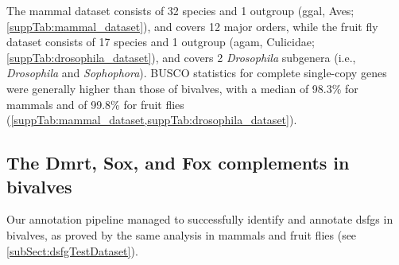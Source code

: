 The mammal dataset consists of 32 species and 1 outgroup (\gls{ggal}, Aves; \cref{suppTab:mammal_dataset}), and covers 12 major orders, while the fruit fly dataset consists of 17 species and 1 outgroup (\gls{agam}, Culicidae; \cref{suppTab:drosophila_dataset}), and covers 2 \textit{Drosophila} subgenera (i.e., \textit{Drosophila} and \textit{Sophophora}). BUSCO statistics for complete single-copy genes were generally higher than those of bivalves, with a median of 98.3\% for mammals and of 99.8\% for fruit flies (\cref{suppTab:mammal_dataset,suppTab:drosophila_dataset}).

\subsection{The Dmrt, Sox, and Fox complements in bivalves}
Our annotation pipeline managed to successfully identify and annotate \glspl{dsfg} in bivalves, as proved by the same analysis in mammals and fruit flies (see \cref{subSect:dsfgTestDataset}).

